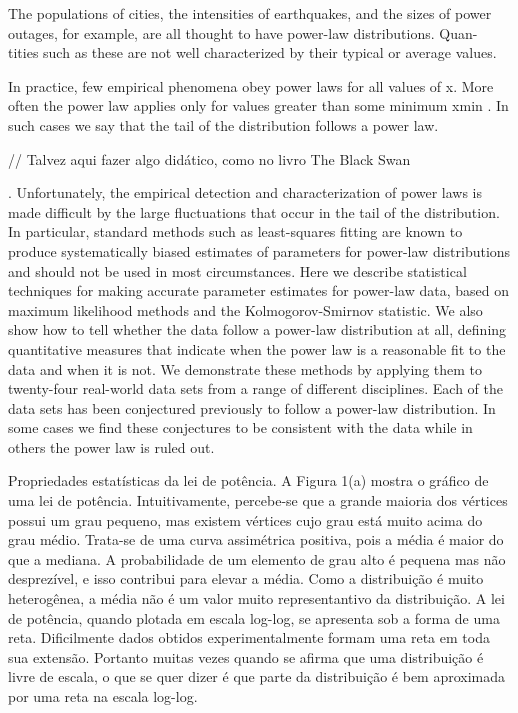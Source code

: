 \documentclass{article}
\begin{document}

              The populations of cities, the intensities of earthquakes, and the sizes of
power outages, for example, are all thought to have power-law distributions. Quan-
tities such as these are not well characterized by their typical or average values.

    In practice, few empirical phenomena obey power laws for all values of x. More
often the power law applies only for values greater than some minimum xmin . In such
cases we say that the tail of the distribution follows a power law.


// Talvez aqui fazer algo didático, como no livro The Black Swan

. Unfortunately, the empirical detection and characterization of power laws is made difficult by the large fluctuations that occur in the tail of the distribution. In particular, standard methods such as least-squares fitting are known to produce systematically biased estimates of parameters for power-law distributions and should not be used in most circumstances. Here we describe statistical techniques for making accurate parameter estimates for power-law data, based on maximum likelihood methods and the Kolmogorov-Smirnov statistic. We also show how to tell whether the data follow a power-law distribution at all, defining quantitative measures that indicate when the power law is a reasonable fit to the data and when it is not. We demonstrate these methods by applying them to twenty-four real-world data sets from a range of different disciplines. Each of the data sets has been conjectured previously to follow a power-law distribution. In some cases we find these conjectures to be consistent with the data while in others the power law is ruled out.

Propriedades estatísticas da lei de potência. A Figura 1(a) mostra o gráfico de uma lei de potência. Intuitivamente, percebe-se que a grande maioria dos vértices possui um grau pequeno, mas existem vértices cujo grau está muito acima do grau médio. Trata-se de uma curva assimétrica positiva, pois a média é maior do que a mediana. A probabilidade de um elemento de grau alto é pequena mas não desprezível, e isso contribui para elevar a média. Como a distribuição é muito heterogênea, a média não é um valor muito representantivo da distribuição. A lei de potência, quando plotada em escala log-log, se apresenta sob a forma de uma reta. Dificilmente dados obtidos experimentalmente formam uma reta em toda sua extensão. Portanto muitas vezes quando se afirma que uma distribuição é livre de escala, o que se quer dizer é que parte da distribuição é bem aproximada por uma reta na escala log-log.
\end{document}

